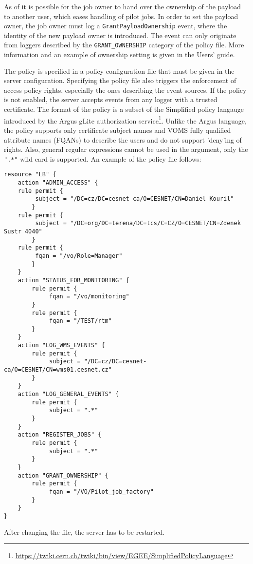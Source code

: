 As of  it is possible for the job owner to hand over the ownership
of the payload to another user, which eases handling \eg of pilot jobs. In
order to set the payload owner, the job owner must log a
\verb'GrantPayloadOwnership' event, where the identity of the new
payload owner is introduced. The event can only originate from loggers
described by the \verb'GRANT_OWNERSHIP' category of the policy file. More
information and an example of ownership setting is given in the \LB Users'
guide.

The \LB policy is specified in a policy configuration file that must be given
in the server configuration. Specifying the policy file also triggers the
enforcement of access policy rights, especially the ones describing the event
sources. If the policy is not enabled, the \LB server accepts events from any
logger with a trusted certificate. The format of the policy is a subset of the
Simplified policy langauge introduced by the Argus gLite authorization
service\footnote{\url{https://twiki.cern.ch/twiki/bin/view/EGEE/SimplifiedPolicyLanguage}}.
Unlike the Argus language, the \LB policy supports only certificate subject
names and VOMS fully qualified attribute names (FQANs) to describe the users
and do not support 'deny'ing of rights.  Also, general regular expressions
cannot be used in the argument, only the \verb'".*"' wild card is supported. An
example of the policy file follows:

\begin{lstlisting}
resource "LB" {
    action "ADMIN_ACCESS" {
	rule permit {
	     subject = "/DC=cz/DC=cesnet-ca/O=CESNET/CN=Daniel Kouril"
        }
	rule permit {
	     subject = "/DC=org/DC=terena/DC=tcs/C=CZ/O=CESNET/CN=Zdenek Sustr 4040"
        }
	rule permit {
	     fqan = "/vo/Role=Manager"
        }
    }
    action "STATUS_FOR_MONITORING" {
        rule permit {
             fqan = "/vo/monitoring"
        }
        rule permit {
             fqan = "/TEST/rtm"
        }
    }
    action "LOG_WMS_EVENTS" {
        rule permit {
             subject = "/DC=cz/DC=cesnet-ca/O=CESNET/CN=wms01.cesnet.cz"
        }
    }
    action "LOG_GENERAL_EVENTS" {
        rule permit {
             subject = ".*"
        }
    }
    action "REGISTER_JOBS" {
        rule permit {
             subject = ".*"
        }
    }
    action "GRANT_OWNERSHIP" {
        rule permit {
             fqan = "/VO/Pilot_job_factory"
        }
    }
}
\end{lstlisting}

After changing the file, the server has to be restarted.

